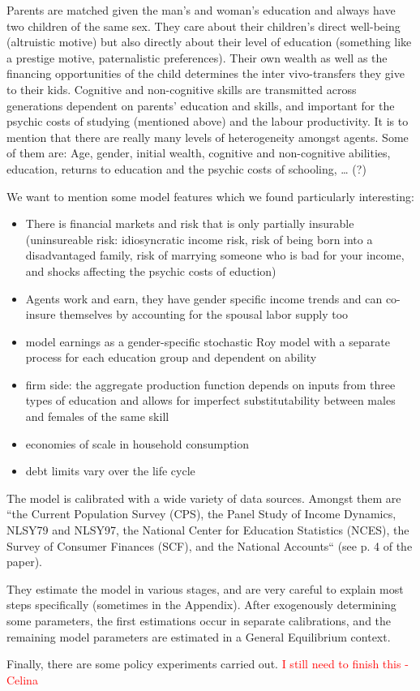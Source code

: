 \documentclass[12pt,a4paper,xcolor=dvipsnames]{article}
\begin{document}
Parents are matched given the man’s and woman’s education and always have two children of the same sex. They care about their children’s direct well-being (altruistic motive) but also directly about their level of education (something like a prestige motive, paternalistic preferences). Their own wealth as well as the financing opportunities of the child determines the inter vivo-transfers they give to their kids. Cognitive and non-cognitive skills are transmitted across generations dependent on parents’ education and skills, and important for the psychic costs of studying (mentioned above) and the labour productivity. 
It is to mention that there are really many levels of heterogeneity amongst agents. Some of them are: Age, gender, initial wealth, cognitive and non-cognitive abilities, education, returns to education and the psychic costs of schooling, … (?)

We want to mention some model features which we found particularly interesting:
\begin{itemize}
    \item There is financial markets and risk that is only partially insurable (uninsureable risk: idiosyncratic income risk, risk of being born into a disadvantaged family, risk of marrying someone who is bad for your income, and shocks affecting the psychic costs of eduction)
    \item Agents work and earn, they have gender specific income trends and can co-insure themselves by accounting for the spousal labor supply too
    \item model earnings as a gender-specific stochastic Roy model with a separate process for each education group and dependent on ability
    \item firm side: the aggregate production function depends on inputs from three types of education and allows for imperfect substitutability between males and females of the same skill
    \item economies of scale in household consumption
    \item debt limits vary over the life cycle
\end{itemize}

The model is calibrated with a wide variety of data sources. Amongst them are “the Current Population Survey (CPS), the Panel Study of Income Dynamics, NLSY79 and NLSY97, the National Center for Education Statistics (NCES), the Survey of Consumer Finances (SCF), and the National Accounts“ (see p. 4 of the paper). 

They estimate the model in various stages, and are very careful to explain most steps specifically (sometimes in the Appendix). After exogenously determining some parameters, the first estimations occur in separate calibrations, and the remaining model parameters are estimated in a General Equilibrium context. 

Finally, there are some policy experiments carried out. \textcolor{red}{I still need to finish this - Celina}


\pagebreak
\end{document}
